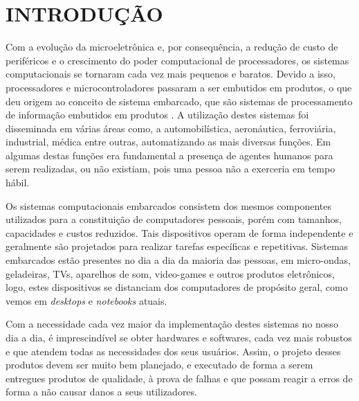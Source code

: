 
\chapter{INTRODUÇÃO}
\label{chap:introducao}
Com a evolução da microeletrônica e, por consequência, a redução de custo de periféricos e o crescimento do poder computacional de processadores, os sistemas computacionais se tornaram cada vez mais pequenos e baratos. Devido a isso, processadores e microcontroladores passaram a ser embutidos em produtos, o que deu origem ao conceito de sistema embarcado, que são sistemas de processamento de informação embutidos em produtos \cite{Marwedel2006}.
A utilização destes sistemas foi disseminada em várias áreas como, a automobilística, aeronáutica, ferroviária, industrial, médica entre outras, automatizando as mais diversas funções. Em algumas destas funções era fundamental a presença de agentes humanos para serem realizadas, ou não existiam, pois uma pessoa não a exerceria em tempo hábil.


Os sistemas computacionais embarcados consistem dos mesmos componentes utilizados para a constituição de computadores pessoais, porém com tamanhos, capacidades e custos reduzidos. Tais dispositivos operam de forma independente e geralmente são projetados para realizar tarefas específicas e repetitivas. 
Sistemas embarcados estão presentes no dia a dia da maioria das pessoas, em micro-ondas, geladeiras, TVs, aparelhos de som, video-games e outros produtos eletrônicos\cite{Marwedel2006}, logo, estes dispositivos se distanciam dos computadores de propósito geral, como vemos em \textit{desktops} e \textit{notebooks} atuais. 




Com a necessidade cada vez maior da implementação destes sistemas no nosso dia a dia, é imprescindível se obter hardwares e softwares, cada vez mais robustos e que atendem todas as necessidades dos seus usuários.
Assim, o projeto desses produtos devem ser muito bem planejado, e executado de forma a serem entregues produtos de qualidade, à  prova de falhas e que possam reagir a erros de forma a não causar danos a seus utilizadores. 

